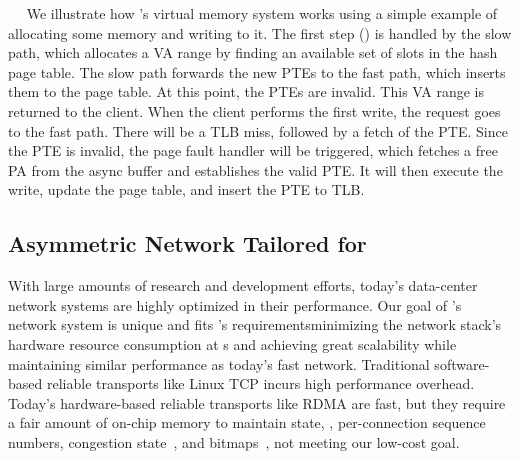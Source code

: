 ~~
We illustrate how \sysboard{}'s virtual memory system works using a simple example of allocating some memory and writing to it.
The first step (\alloc) is handled by the slow path, which allocates a VA range by finding an available set of slots in the hash page table.
The slow path forwards the new PTEs to the fast path, which inserts them to the page table.
At this point, the PTEs are invalid.
This VA range is returned to the client.
When the client performs the first write, the request goes to the fast path.
There will be a TLB miss, followed by a fetch of the PTE.
Since the PTE is invalid, the page fault handler will be triggered,
which fetches a free PA from the async buffer and establishes the valid PTE.
It will then execute the write, update the page table, and insert the PTE to TLB.

\subsection{Asymmetric Network Tailored for \md}
\label{sec:clio:network}
With large amounts of research and development efforts, today's data-center network systems are highly optimized in their performance.
Our goal of \sys's network system is unique and fits \md's requirements\textemdash minimizing the network stack's hardware resource consumption at \MN{}s and achieving great scalability while maintaining similar performance as today's fast network.
Traditional software-based reliable transports like Linux TCP incurs high performance overhead.
Today's hardware-based reliable transports like RDMA are fast, but they require a fair amount of on-chip memory to maintain state, \eg, per-connection sequence numbers, congestion state~\cite{TONIC}, and bitmaps~\cite{IRN,MELO-APNet}, not meeting our low-cost goal.

